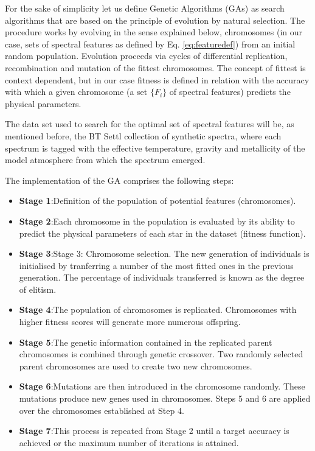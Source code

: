 For the sake of simplicity let us define Genetic Algorithms (GAs) as
search algorithms that are based on the principle of evolution by
natural selection. The procedure works by evolving in the sense
explained below, chromosomes (in our case, sets of spectral features
as defined by Eq. \ref{eq:featuredef}) from an initial random
population. Evolution proceeds via cycles of differential replication,
recombination and mutation of the fittest chromosomes. The concept of
fittest is context dependent, but in our case fitness is defined in
relation with the accuracy with which a given chromosome (a set
$\{F_i\}$ of spectral features) predicts the physical parameters.

The data set used to search for the optimal set of spectral features
will be, as mentioned before, the BT Settl collection of synthetic
spectra, where each spectrum is tagged with the effective temperature,
gravity and metallicity of the model atmosphere from which the
spectrum emerged.

The implementation of the GA comprises the following steps:

\begin{itemize}
\item \textbf{Stage 1}:{Definition of the population of
potential features (chromosomes).}

\item \textbf{Stage 2}:{Each chromosome in the population
is evaluated by its ability to predict the physical parameters of each
star in the dataset (fitness function). }

\item \textbf{Stage 3}:{Stage 3: Chromosome selection. The new
generation of individuals is initialised by tranferring a number of
the most fitted ones in the previous generation. The percentage of
individuals transferred is known as the degree of elitism. }

\item \textbf{Stage 4}:{The population of chromosomes is replicated. 
 Chromosomes with higher fitness scores will generate more numerous
 offspring.}

\item \textbf{Stage 5}:{The genetic information contained in
the replicated parent chromosomes is combined through genetic
crossover. Two randomly selected parent chromosomes are used to create
two new chromosomes.}

\item \textbf{Stage 6}:{Mutations are then introduced in the
chromosome randomly. These mutations produce new genes used in
chromosomes.  Steps 5 and 6 are applied over the chromosomes
established at Step 4.}

\item \textbf{Stage 7}:{This process is repeated from Stage 2 until 
a target accuracy is achieved or the maximum number of iterations is
attained.}

\end{itemize}

